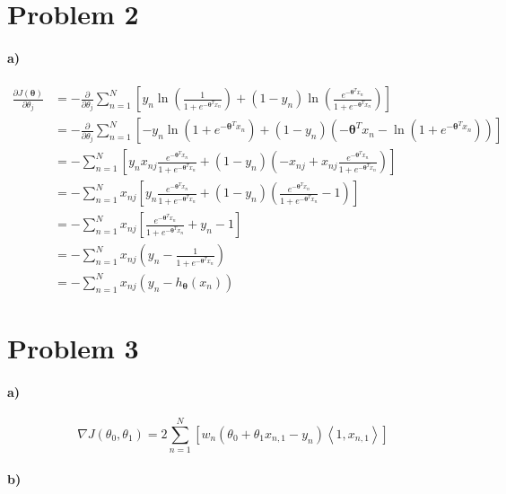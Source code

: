\documentclass[12pt]{article}
\begin{document}
\section*{Problem 2}

\paragraph{a)}

\begin{align*}
        \frac{\partial J(\pmb{\theta})}{\partial \theta_j}
        &=-\frac{\partial}{\partial \theta_j}\sum_{n=1}^N \left[y_n \ln\left(\frac{1}{1+e^{-\pmb{\theta}^T x_n}}\right)
        +(1-y_n)\ln\left(\frac{e^{-\pmb{\theta}^T x_n}}{1+e^{-\pmb{\theta}^T x_n}}\right)\right]\\
        &=-\frac{\partial}{\partial \theta_j}\sum_{n=1}^N \left[-y_n \ln\left(1+e^{-\pmb{\theta}^T x_n}\right)
        +(1-y_n)\left(-\pmb{\theta}^T x_n-\ln\left(1+e^{-\pmb{\theta}^T x_n}\right)\right)\right]\\
        &=-\sum_{n=1}^N \left[y_nx_{nj}\frac{e^{-\pmb{\theta}^T x_n }}{1+e^{-\pmb{\theta}^T x_n}}
        +(1-y_n)\left(-x_{nj}+x_{nj}\frac{e^{-\pmb{\theta}^T x_n }}{1+e^{-\pmb{\theta}^T x_n}}\right)\right]\\
        &=-\sum_{n=1}^N x_{nj}\left[y_n\frac{e^{-\pmb{\theta}^T x_n }}{1+e^{-\pmb{\theta}^T x_n}}
        +(1-y_n)\left(\frac{e^{-\pmb{\theta}^T x_n }}{1+e^{-\pmb{\theta}^T x_n}}-1\right)\right]\\
        &=-\sum_{n=1}^N x_{nj}\left[\frac{e^{-\pmb{\theta}^T x_n }}{1+e^{-\pmb{\theta}^T x_n}}+y_n-1\right]\\
        &=-\sum_{n=1}^N x_{nj}\left(y_n-\frac{1}{1+e^{-\pmb{\theta}^T x_n}}\right)\\
        &=-\sum_{n=1}^N x_{nj}\left(y_n-h_{\pmb{\theta}}(x_n)\right)
\end{align*}

\section*{Problem 3}

\paragraph{a)}

\[\nabla J(\theta_0,\theta_1)=2\sum_{n=1}^N \left[w_n(\theta_0+\theta_1x_{n,1}-y_n)\left<1, x_{n,1}\right>\right]\]

\paragraph{b)}
\end{document}
